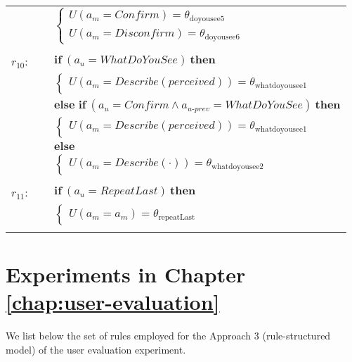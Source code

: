 \begin{footnotesize}
\begin{longtable}{p{1cm}p{14cm}}
& \;\;\;\;\; $ \begin{cases}U(\mathit{a_m}\!=\!\mathit{Confirm})\!=\!\theta_{\mathrm{doyousee5}} \\
U(\mathit{a_m}\!=\!\mathit{Disconfirm})\!=\!\theta_{\mathrm{doyousee6}} \end{cases}$ \\ \\[-2mm]
$r_{10}$: \ \ & $ \textbf{if} \ (\mathit{a_u}\!=\!\mathit{WhatDoYouSee}) \ \textbf{then} $ \\
 & \;\;\;\;\; $ \begin{cases}U(\mathit{a_m}\!=\!\mathit{Describe({perceived})})\!=\!\theta_{\mathrm{whatdoyousee1}} \end{cases}$\\[3mm] & $ \textbf{else if} \ (\mathit{a_u}\!=\!\mathit{Confirm} \land \mathit{a_{u\mbox{-}prev}}\!=\!\mathit{WhatDoYouSee}) \ \textbf{then}$ \\
& \;\;\;\;\; $ \begin{cases}U(\mathit{a_m}\!=\!\mathit{Describe({perceived})})\!=\!\theta_{\mathrm{whatdoyousee1}} \end{cases}$\\[3mm] & $ \textbf{else}$ \\
& \;\;\;\;\; $ \begin{cases}U(\mathit{a_m}\!=\!\mathit{Describe(\cdot)})\!=\!\theta_{\mathrm{whatdoyousee2}} \end{cases}$ \\ \\[-2mm]
$r_{11}$: \ \ & $ \textbf{if} \ (\mathit{a_u}\!=\!\mathit{RepeatLast}) \ \textbf{then} $ \\
 & \;\;\;\;\; $ \begin{cases}U(\mathit{a_m}\!=\!\mathit{{a_m}})\!=\!\theta_{\mathrm{repeatLast}} \end{cases}$ \\ \\[-2mm]
\end{longtable}
\end{footnotesize}

\section{Experiments in Chapter \ref{chap:user-evaluation}}
\label{sec:domainspecs-usereval}

We list below the set of rules employed for the Approach 3 (rule-structured model) of the user evaluation experiment. 

